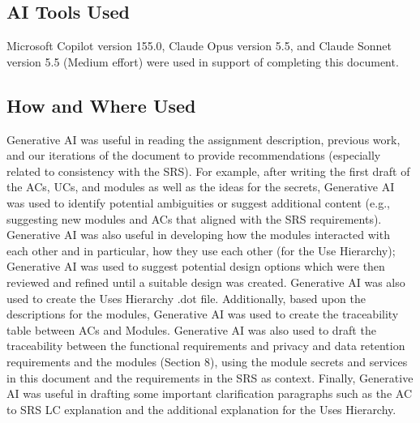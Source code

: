 \documentclass[12pt, titlepage]{article}
\begin{document}
\subsection{AI Tools Used}


Microsoft Copilot version 155.0, Claude Opus version 5.5, and Claude Sonnet version 5.5 (Medium effort) were used in support of completing this document.

\subsection{How and Where Used}




Generative AI was useful in reading the assignment description, previous work, and our iterations of the document to provide recommendations (especially related to consistency with the SRS). For example, after writing the first draft of the ACs, UCs, and modules as well as the ideas for the secrets, Generative AI was used to identify potential ambiguities or suggest additional content (e.g., suggesting new modules and ACs that aligned with the SRS requirements). Generative AI was also useful in developing how the modules interacted with each other and in particular, how they use each other (for the Use Hierarchy); Generative AI was used to suggest potential design options which were then reviewed and refined until a suitable design was created. Generative AI was also used to create the Uses Hierarchy .dot file. Additionally, based upon the descriptions for the modules, Generative AI was used to create the traceability table between ACs and Modules. Generative AI was also used to draft the traceability between the functional requirements and privacy and data retention requirements and the modules (Section 8), using the module secrets and services in this document and the requirements in the SRS as context. Finally, Generative AI was useful in drafting some important clarification paragraphs such as the AC to SRS LC explanation and the additional explanation for the Uses Hierarchy.
\end{document}
